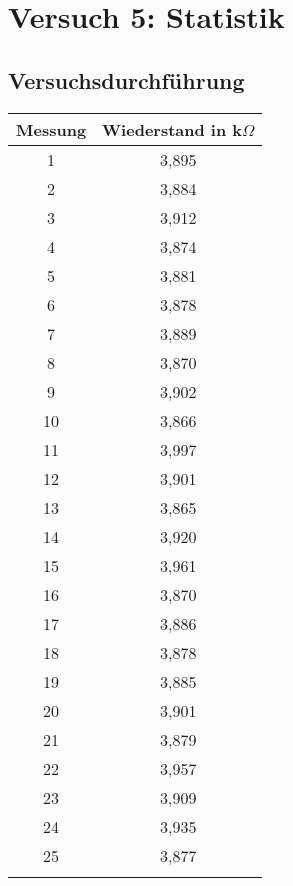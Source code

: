 \chapter{Versuch 5: Statistik}

\section{Versuchsdurchführung}


\begin{tabular}[h]{c|c}
	Messung & Wiederstand in k$\Omega$ \\
	\hline
	1 & 3,895\\
	\hline
	2& 3,884\\
	\hline
	3 & 3,912\\
	\hline
	4 & 3,874\\
	\hline
	5& 3,881\\
	\hline
	6 & 3,878\\
	\hline
	7 & 3,889\\
	\hline
	8& 3,870\\
	\hline
	9 & 3,902\\
	\hline
	10 & 3,866\\
	\hline
	11& 3,997\\
	\hline
	12& 3,901\\
	\hline
	13& 3,865\\
	\hline
	14& 3,920\\
	\hline
	15& 3,961\\
	\hline
	16& 3,870\\
	\hline
	17& 3,886\\
	\hline
	18& 3,878\\
	\hline
	19& 3,885\\
	\hline
	20& 3,901\\
	\hline
	21& 3,879\\
	\hline
	22& 3,957\\
	\hline
	23& 3,909\\
	\hline
	24& 3,935\\
	\hline
	25& 3,877\\
	\label{tab:Messreihe Wiederstände}
\end{tabular}
